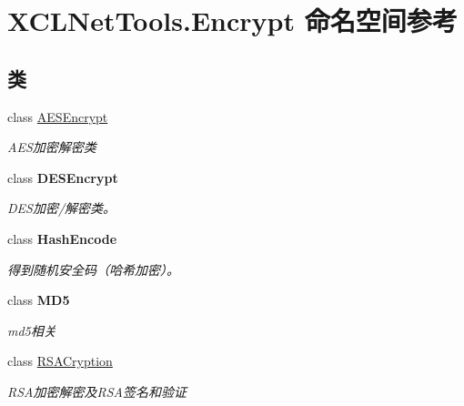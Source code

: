\hypertarget{namespace_x_c_l_net_tools_1_1_encrypt}{}\section{X\+C\+L\+Net\+Tools.\+Encrypt 命名空间参考}
\label{namespace_x_c_l_net_tools_1_1_encrypt}
\subsection*{类}
\begin{DoxyCompactItemize}
\item 
class \hyperlink{class_x_c_l_net_tools_1_1_encrypt_1_1_a_e_s_encrypt}{A\+E\+S\+Encrypt}
\begin{DoxyCompactList}\small\item\em A\+E\+S加密解密类 \end{DoxyCompactList}\item 
class {\bfseries D\+E\+S\+Encrypt}
\begin{DoxyCompactList}\small\item\em D\+E\+S加密/解密类。 \end{DoxyCompactList}\item 
class {\bfseries Hash\+Encode}
\begin{DoxyCompactList}\small\item\em 得到随机安全码（哈希加密）。 \end{DoxyCompactList}\item 
class {\bfseries M\+D5}
\begin{DoxyCompactList}\small\item\em md5相关 \end{DoxyCompactList}\item 
class \hyperlink{class_x_c_l_net_tools_1_1_encrypt_1_1_r_s_a_cryption}{R\+S\+A\+Cryption}
\begin{DoxyCompactList}\small\item\em R\+S\+A加密解密及\+R\+S\+A签名和验证 \end{DoxyCompactList}\end{DoxyCompactItemize}
